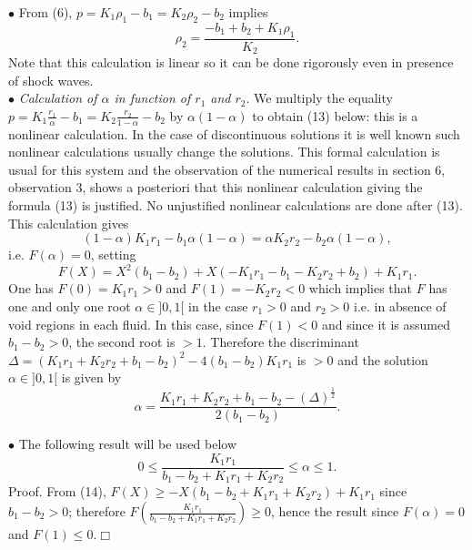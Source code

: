 \documentclass[a4paper,12pt]{article}
\begin{document}
$\bullet$ From (6), $p=K_1\rho_1-b_1=K_2\rho_2-b_2 $ implies 
\begin{equation}\rho_2=\frac{-b_1+b_2+K_1\rho_1}{K_2}.\end{equation}
Note that this calculation is linear so it can be done rigorously even in presence of shock waves.\\

$\bullet$\textit{  Calculation of $\alpha$ in function of $r_1$ and $ r_2$}. We multiply the equality $p=K_1\frac{r_1}{\alpha}-b_1=K_2\frac{r_2}{1-\alpha}-b_2$ by $\alpha(1-\alpha)$ to obtain (13) below:
 this is a nonlinear calculation.  In the case of discontinuous solutions it is well known such nonlinear calculations usually change the solutions. This  formal calculation  is usual for this system and the observation of the numerical results in section 6, observation 3, shows a posteriori that this nonlinear calculation giving the formula (13) is justified.
No unjustified nonlinear calculations are done after (13). This calculation gives
\begin{equation}(1-\alpha)K_1r_1-b_1\alpha(1-\alpha)=\alpha K_2r_2-b_2\alpha(1-\alpha),\end{equation}
i.e. $F(\alpha)=0$,
setting 
\begin{equation}F(X)=X^2(b_1-b_2)+X(-K_1r_1-b_1-K_2r_2+b_2)+K_1r_1.\end{equation}
One has $F(0)=K_1r_1> 0$ and $ F(1)=-K_2r_2<0$ which implies that $F$ has one and only one root  $\alpha\in ]0,1[$ in the case $r_1>0$ and $r_2>0$ i.e. in absence of void regions in each fluid. In this case, since $F(1)<0$ and since it is assumed  $b_1-b_2>0$, the second root is $>1$.  Therefore the discriminant $\Delta=(K_1r_1+K_2r_2+b_1-b_2)^2-4(b_1-b_2)K_1r_1$ is $>0$ and the solution $\alpha\in ]0,1[$ is given by 
\begin{equation} \alpha=\frac{K_1r_1+K_2r_2+b_1-b_2-(\Delta)^{\frac{1}{2}}}{2(b_1-b_2)}.\end{equation}

$\bullet$ The following result will be used below
  \begin{equation}0\leq\frac{K_1r_1}{b_1-b_2+K_1r_1+K_2r_2}\leq \alpha\leq 1.\end{equation}
Proof. From (14), $F(X)\geq -X(b_1-b_2+K_1r_1+K_2r_2)+K_1r_1$ since $b_1-b_2>0$; therefore $F(\frac{K_1r_1}{b_1-b_2+K_1r_1+K_2r_2})\geq 0$, hence the result since $F(\alpha)=0$ and $F(1)\leq 0$.$\Box$\\
\end{document}
